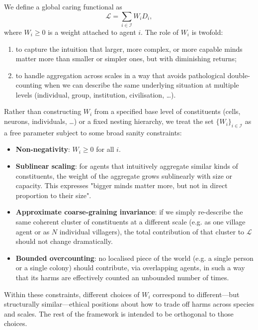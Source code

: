 \documentclass[11pt]{article}
\begin{document}
We define a global caring functional as
\begin{equation}
  \mathcal L = \sum_{i \in \mathcal I} W_i D_i, \label{eq:L-def}
\end{equation}
where $W_i \ge 0$ is a weight attached to agent $i$. The role of $W_i$ is twofold:
\begin{enumerate}
  \item to capture the intuition that larger, more complex, or more capable minds matter more than smaller or simpler ones, but with diminishing returns;
  \item to handle aggregation across scales in a way that avoids pathological double-counting when we can describe the same underlying situation at multiple levels (individual, group, institution, civilisation, \dots).
\end{enumerate}

Rather than constructing $W_i$ from a specified base level of constituents (cells, neurons, individuals, \dots) or a fixed nesting hierarchy, we treat the set $\{W_i\}_{i \in \mathcal I}$ as a free parameter subject to some broad sanity constraints:
\begin{itemize}
  \item \textbf{Non-negativity}: $W_i \ge 0$ for all $i$.
  \item \textbf{Sublinear scaling}: for agents that intuitively aggregate similar kinds of constituents, the weight of the aggregate grows sublinearly with size or capacity. This expresses "bigger minds matter more, but not in direct proportion to their size".
  \item \textbf{Approximate coarse-graining invariance}: if we simply re-describe the same coherent cluster of constituents at a different scale (e.g. as one village agent or as $N$ individual villagers), the total contribution of that cluster to $\mathcal L$ should not change dramatically.
  \item \textbf{Bounded overcounting}: no localised piece of the world (e.g. a single person or a single colony) should contribute, via overlapping agents, in such a way that its harms are effectively counted an unbounded number of times.
\end{itemize}

Within these constraints, different choices of $W_i$ correspond to different---but structurally similar---ethical positions about how to trade off harms across species and scales. The rest of the framework is intended to be orthogonal to those choices.
\end{document}
